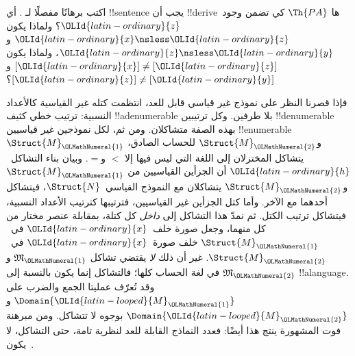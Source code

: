 \documentclass[../../../include/open-logic-section]{subfiles}
\begin{document}
\begin{prob}
اكتب برهانًا مفصلًا لـ
. أي !!{sentence} يجب أن
!!{derive}ها $\Th{PA}$ كي تضمن وجود~$\OLId{latin-ordinary}{z}$؟ ولماذا يكون $\OLId{latin-ordinary}{x} \nsless \OLId{latin-ordinary}{z}$
و$\OLId{latin-ordinary}{z} \nsless \OLId{latin-ordinary}{y}$، ولماذا يكون $[\OLId{latin-ordinary}{x}] \neq [\OLId{latin-ordinary}{z}]$ و$[\OLId{latin-ordinary}{z}] \neq [\OLId{latin-ordinary}{y}]$؟
\end{prob}

\begin{explain}
فإذا قصرنا النظر على نموذج غير قياسي قابل للعد، انتظمت
كتله غير القياسية كالأعداد النسبية: ترتيب خطي كثيف
!!a{denumerable} بلا طرفين. وكل ترتيبين !!{denumerable}
بهذه الصفة متشاكلان. ومن ثم، لكل نموذجين غير قياسيين
!!{enumerable}~$\Struct{M}_\OLMathNumeral{1}$ و$\Struct{M}_\OLMathNumeral{2}$ للحساب الصادق،
يتشاكل المختزلان إلى اللغة التي ليس فيها إلا $<$ و$=$.
وبيان بناء التشاكل~$\OLId{latin-ordinary}{h}$ أن الجزأين القياسيين من $\Struct{M}_\OLMathNumeral{1}$
و$\Struct{M}_\OLMathNumeral{2}$ يتشاكلان مع النموذج القياسي~$\Struct{N}$،
فيتشاكل أحدهما مع الآخر. وأما كتل الجزأين غير القياسيين،
فترتيبها كترتيب الأعداد النسبية، فيتشاكل ترتيب الكتل.
ثم نمدّ هذا التشاكل إلى \emph{داخل} كل كتلة، بمقابلة
عنصر مختار من كل منهما، وجعل صورة خلف~$\OLId{latin-ordinary}{x}$
في~$\Struct{M}_\OLMathNumeral{1}$ خلف صورة~$\OLId{latin-ordinary}{x}$ في~$\Struct{M}_\OLMathNumeral{2}$.
غير أن ذلك \emph{لا} يقتضي تشاكل $\mathfrak{M}_\OLMathNumeral{1}$
و$\mathfrak{M}_\OLMathNumeral{2}$ في لغة الحساب كلها؛ فالتشاكل إنما يكون
بالنسبة إلى !!a{language}. وقد تُعرّف عمليتا الجمع والضرب
على $\Domain{\OLId{latin-looped}{M}_\OLMathNumeral{1}}$ و$\Domain{\OLId{latin-looped}{M}_\OLMathNumeral{2}}$ بوجوه لا تتشاكل.
ومن مبرهنة فوت المشهورة ينتج هذا أيضًا: فعدد النماذج
القابلة للعد لنظرية تامة، حتى التشاكل، لا يكون~.
\end{explain}
\end{document}
